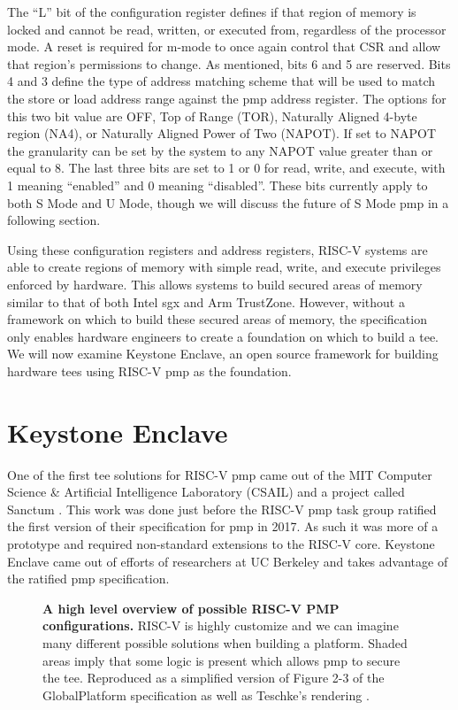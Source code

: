 The ``L'' bit of the configuration register defines if that region of memory is locked and cannot be read, written, or executed from, regardless of the processor mode. A reset is required for m-mode to once again control that CSR and allow that region's permissions to change. As mentioned, bits 6 and 5 are reserved. Bits 4 and 3 define the type of address matching scheme that will be used to match the store or load address range against the \gls{pmp} address register. The options for this two bit value are OFF, Top of Range (TOR), Naturally Aligned 4-byte region (NA4), or Naturally Aligned Power of Two (NAPOT). If set to NAPOT the granularity can be set by the system to any NAPOT value greater than or equal to 8. The last three bits are set to 1 or 0 for read, write, and execute, with 1 meaning ``enabled'' and 0 meaning ``disabled''. These bits currently apply to both S Mode and U Mode, though we will discuss the future of S Mode \gls{pmp} in a following section.

Using these configuration registers and address registers, RISC-V systems are able to create regions of memory with simple read, write, and execute privileges enforced by hardware. This allows systems to build secured areas of memory similar to that of both Intel \gls{sgx} and Arm TrustZone. However, without a framework on which to build these secured areas of memory, the specification only enables hardware engineers to create a foundation on which to build a \gls{tee}. We will now examine Keystone Enclave, an open source framework for building hardware \glspl{tee} using RISC-V \gls{pmp} as the foundation.

\section{Keystone Enclave}
One of the first \gls{tee} solutions for RISC-V \gls{pmp} came out of the MIT Computer Science \& Artificial Intelligence Laboratory (CSAIL) and a project called Sanctum \cite{Costan2016a}. This work was done just before the RISC-V \gls{pmp} task group ratified the first version of their specification for \gls{pmp} in 2017. As such it was more of a prototype and required non-standard extensions to the RISC-V core. Keystone Enclave came out of efforts of researchers at UC Berkeley and takes advantage of the ratified \gls{pmp} specification.

\begin{figure}[ht]
\centering

\caption[High Level RISC-V PMP Overview]{\textbf{A high level overview of possible RISC-V PMP configurations.} RISC-V is highly customize and we can imagine many different possible solutions when building a platform. Shaded areas imply that some logic is present which allows \gls{pmp} to secure the \gls{tee}. Reproduced as a simplified version of Figure 2-3 of the GlobalPlatform specification \cite{GlobalPlatform2018} as well as Teschke's rendering \cite{TeschkeSGX}.}
\label{fig:rv-hl}
\end{figure}

